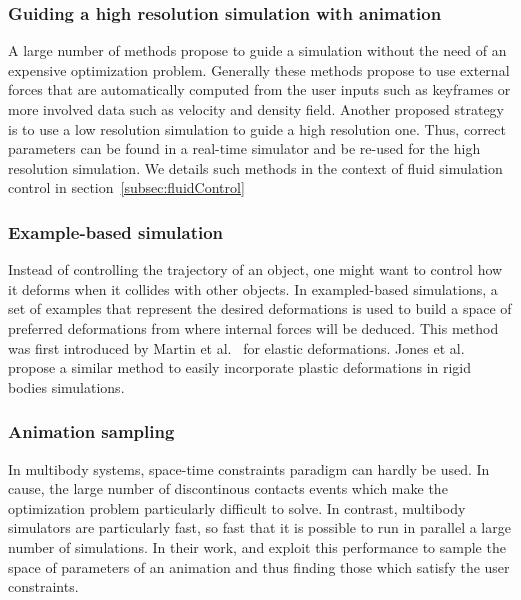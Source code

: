 \subsubsection{Guiding a high resolution simulation with animation}
A large number of methods propose to guide a simulation without the need of an expensive optimization problem. Generally these methods propose to use external forces that are automatically computed from the user inputs such as keyframes or more involved data such as velocity and density field. Another proposed strategy is to use a low resolution simulation to guide a high resolution one. Thus, correct parameters can be found in a real-time simulator and be re-used for the high resolution simulation.  We details such methods in the context of fluid simulation control in section~\ref{subsec:fluidControl}

\subsubsection{Example-based simulation}
Instead of controlling the trajectory of an object, one might want to control how it deforms when it collides with other objects. In exampled-based simulations, a set of examples that represent the desired deformations is used to build a space of preferred deformations from where internal forces will be deduced. This method was first introduced by Martin et al.~\cite{Martin2011} for elastic deformations. Jones et al.\cite{Jones2016} propose a similar method to easily incorporate plastic deformations in rigid bodies simulations.

\subsubsection{Animation sampling}
In multibody systems, space-time constraints paradigm can hardly be used. In cause, the large number of discontinous contacts events which make the optimization problem particularly difficult to solve. In contrast, multibody simulators are particularly fast, so fast that it is possible to run in parallel a large number of simulations. In their work, \cite{Chenney2000} and \cite{Twigg2007} exploit this performance to sample the space of parameters of an animation and thus finding those which satisfy the user constraints.


